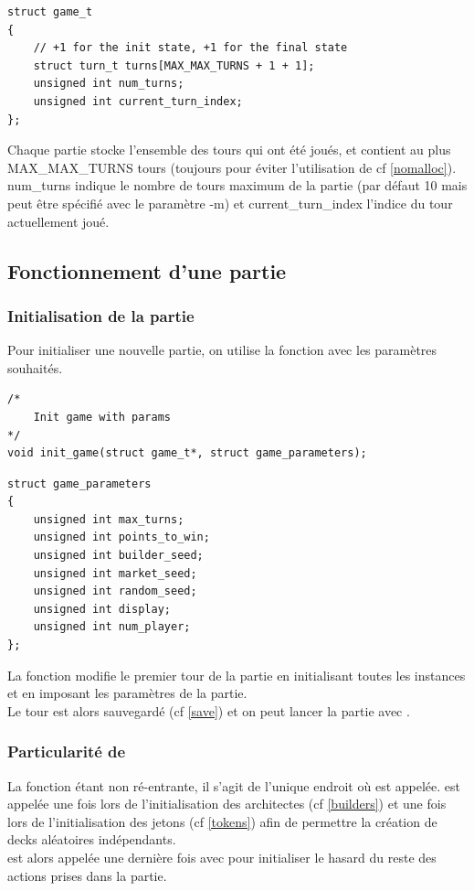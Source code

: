 \begin{lstlisting}[frame=single, caption={Implémentation de la structure game\_t}]
struct game_t
{
    // +1 for the init state, +1 for the final state
    struct turn_t turns[MAX_MAX_TURNS + 1 + 1]; 
    unsigned int num_turns;
    unsigned int current_turn_index;
};
\end{lstlisting}

Chaque partie stocke l'ensemble des tours qui ont été joués, et contient au plus\\ MAX\_MAX\_TURNS tours (toujours pour éviter l'utilisation de  cf \ref{nomalloc}).\\
num\_turns indique le nombre de tours maximum de la partie (par défaut 10 mais peut être spécifié avec le paramètre -m) et current\_turn\_index l'indice du tour actuellement joué.

\subsection*{Fonctionnement d'une partie}

\subsubsection*{Initialisation de la partie}
Pour initialiser une nouvelle partie, on utilise la fonction  avec les paramètres souhaités.
\lstset{language=C, style=code}
\begin{lstlisting}[frame=single]
/*
	Init game with params
*/
void init_game(struct game_t*, struct game_parameters);
\end{lstlisting}

\begin{lstlisting}[frame=single, caption={Structure des paramètres de la partie}]
struct game_parameters
{
	unsigned int max_turns;
	unsigned int points_to_win;
	unsigned int builder_seed;
	unsigned int market_seed;
	unsigned int random_seed;
	unsigned int display;
	unsigned int num_player;
};
\end{lstlisting}

La fonction  modifie le premier tour de la partie en initialisant toutes les instances et en imposant les paramètres de la partie.\\
Le tour est alors sauvegardé (cf \ref{save}) et on peut lancer la partie avec .

\subsubsection*{Particularité de }
La fonction  étant non ré-entrante, il s'agit de l'unique endroit où  est appelée.  est appelée une fois lors de l'initialisation des architectes (cf \ref{builders}) et une fois lors de l'initialisation des jetons (cf \ref{tokens}) afin de permettre la création de decks aléatoires indépendants. \\
 est alors appelée une dernière fois avec  pour initialiser le hasard du reste des actions prises dans la partie.

